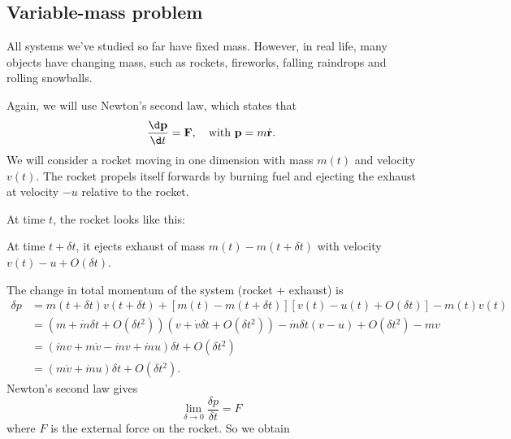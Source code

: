 \documentclass[a4paper]{article}
\begin{document}
\subsection{Variable-mass problem}
All systems we've studied so far have fixed mass. However, in real life, many objects have changing mass, such as rockets, fireworks, falling raindrops and rolling snowballs.

Again, we will use Newton's second law, which states that
\[
  \frac{\d \mathbf{p}}{\d t} = \mathbf{F},\quad\text{with }\mathbf{p} = m\dot{\mathbf{r}}.
\]
We will consider a rocket moving in one dimension with mass $m(t)$ and velocity $v(t)$. The rocket propels itself forwards by burning fuel and ejecting the exhaust at velocity $-u$ relative to the rocket.

At time $t$, the rocket looks like this:
\begin{center}
\end{center}
At time $t + \delta t$, it ejects exhaust of mass $m(t) - m(t + \delta t)$ with velocity $v(t) - u + O(\delta t)$.
\begin{center}
\end{center}
The change in total momentum of the system (rocket + exhaust) is
\begin{align*}
  \delta p &= m(t + \delta t)v(t + \delta t) + [m(t) - m(t + \delta t)][v(t) - u(t) + O(\delta t)] - m(t)v(t)\\
  &= (m + \dot{m}\delta t + O(\delta t^2))(v + \dot{v} \delta t + O(\delta t^2)) - \dot{m}\delta t(v - u) + O(\delta t^2) - mv\\
  &= (\dot{m}v + m\dot{v} - \dot{m}v + \dot{m}u)\delta t + O(\delta t^2)\\
  &= (m\dot{v} + \dot{m}u)\delta t + O(\delta t^2).
\end{align*}
Newton's second law gives
\[
  \lim_{\delta \to 0} \frac{\delta p}{\delta t} = F
\]
where $F$ is the external force on the rocket. So we obtain
\end{document}
